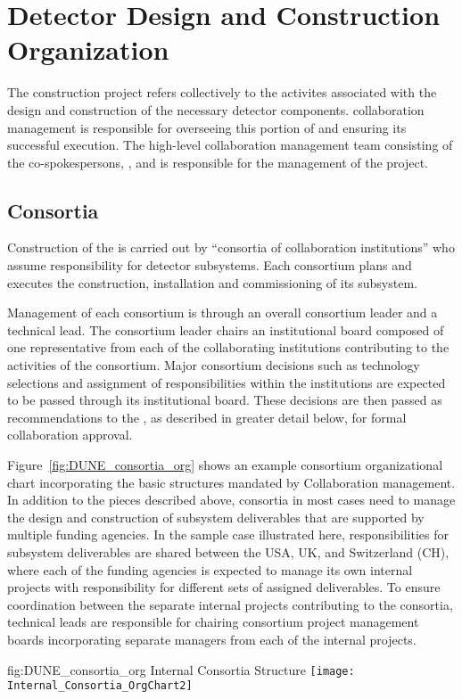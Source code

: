 \chapter{Detector Design and Construction Organization}
\label{vl:tc-overview}

The   construction project refers collectively 
to the activites associated with the design and construction of the
necessary detector components.   collaboration management 
is responsible for overseeing this portion of  and 
ensuring its successful execution.  The high-level  
collaboration management team consisting of the co-spokespersons, 
, and  is responsible for the
management of the project.  

\section{ Consortia}
\label{sec:consortia}

Construction of the   is carried out by 
``consortia of collaboration institutions'' who assume responsibility 
for detector subsystems.  Each consortium plans and executes the 
construction, installation and commissioning of its subsystem.

Management of each consortium is through an overall consortium leader 
and a technical lead.  The consortium leader chairs an institutional 
board composed of one representative from each of the collaborating 
institutions contributing to the activities of the consortium.  Major 
consortium decisions such as technology selections and assignment of 
responsibilities within the institutions are expected to be passed 
through its institutional board.  These decisions are then passed 
as recommendations to the  , as described in 
greater detail below, for formal collaboration approval.

Figure~\ref{fig:DUNE_consortia_org} shows an example consortium 
organizational chart incorporating the basic structures mandated 
by  Collaboration management.  In addition to the pieces 
described above, consortia in most cases need to manage the design 
and construction of subsystem deliverables that are supported by 
multiple funding agencies.  In the sample case illustrated here, 
responsibilities for subsystem deliverables are shared between the 
USA, UK, and Switzerland (CH), where each of the funding agencies 
is expected to manage its own internal projects with responsibility 
for different sets of assigned deliverables.  To ensure coordination 
between the separate internal projects contributing to the consortia, 
technical leads are responsible for chairing consortium project 
management boards incorporating separate managers from each of 
the internal projects.   
\begin{dunefigure}{fig:DUNE_consortia_org}
  { Internal Consortia Structure}
  \texttt{[image: Internal\_Consortia\_OrgChart2]}
\end{dunefigure}

